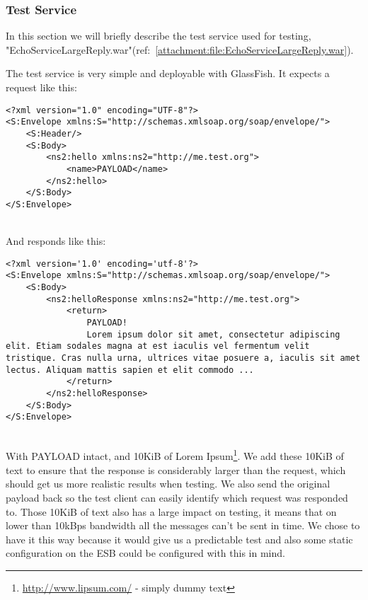 \subsubsection{Test Service}\label{Testing:About:Service}
    In this section we will briefly describe the test service used for testing, "EchoServiceLargeReply.war"(ref:~\ref{attachment:file:EchoServiceLargeReply.war}).

    The test service is very simple and deployable with GlassFish. It expects a request like this:
    \lstset{language=XML, style=eclipse}
    \begin{lstlisting}
<?xml version="1.0" encoding="UTF-8"?>
<S:Envelope xmlns:S="http://schemas.xmlsoap.org/soap/envelope/">
    <S:Header/>
    <S:Body>
        <ns2:hello xmlns:ns2="http://me.test.org">
            <name>PAYLOAD</name>
        </ns2:hello>
    </S:Body>
</S:Envelope>
    \end{lstlisting}
    \\
    And responds like this:
    \begin{lstlisting}
<?xml version='1.0' encoding='utf-8'?>
<S:Envelope xmlns:S="http://schemas.xmlsoap.org/soap/envelope/">
    <S:Body>
        <ns2:helloResponse xmlns:ns2="http://me.test.org">
            <return>
                PAYLOAD!
                Lorem ipsum dolor sit amet, consectetur adipiscing elit. Etiam sodales magna at est iaculis vel fermentum velit tristique. Cras nulla urna, ultrices vitae posuere a, iaculis sit amet lectus. Aliquam mattis sapien et elit commodo ...
            </return>
        </ns2:helloResponse>
    </S:Body>
</S:Envelope>
    \end{lstlisting}
    \\
    With PAYLOAD intact, and 10KiB of Lorem Ipsum\footnote{\url{http://www.lipsum.com/} - simply dummy text}. We add these 10KiB of text to ensure that the response is considerably larger than the request, which should get us more realistic results when testing. We also send the original payload back so the test client can easily identify which request was responded to. Those 10KiB of text also has a large impact on testing, it means that on lower than 10kBps bandwidth all the messages can't be sent in time. We chose to have it this way because it would give us a predictable test and also some static configuration on the ESB could be configured with this in mind.

